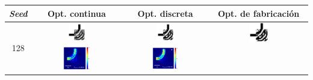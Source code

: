\begin{table}[ht]
    \centering
    \vspace*{-2.5cm}
    \hspace*{-3cm}
    \begin{tabular}{|c|c|c|c|}
    \hline 
    \emph{Seed} & Opt. continua & Opt. discreta &  Opt. de fabricación \\
    \hline
      \multirow{2}{*}{128} &
      \includegraphics[width=0.20\textwidth]{image/results/bend/CMA-ES/visualize_eps_cont_128.png} &
      \includegraphics[width=0.20\textwidth]{image/results/bend/CMA-ES/visualize_eps_disc_128.png} &
      \includegraphics[width=0.20\textwidth]{image/results/bend/CMA-ES/visualize_eps_fab_128.png} \\
      \cline{2-4}
      &
      \includegraphics[width=0.33\textwidth]{image/results/bend/CMA-ES/visualize_field_cont_128.png} &
      \includegraphics[width=0.33\textwidth]{image/results/bend/CMA-ES/visualize_field_disc_128.png} &

\end{tabular}
\end{table}
